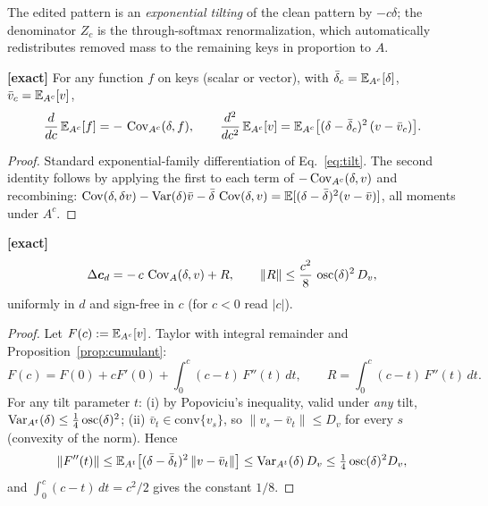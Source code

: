 \documentclass{article}
\begin{document}
The edited pattern is an \emph{exponential tilting} of the clean pattern by $-c\delta$; the denominator $Z_c$ is the through-softmax renormalization, which automatically redistributes removed mass to the remaining keys in proportion to $A$.

\begin{prop}\label{prop:cumulant}
\textbf{[exact]} For any function $f$ on keys (scalar or vector), with $\bar\delta_c = \mathbb{E}_{A^c}[\delta]$, $\bar v_c = \mathbb{E}_{A^c}[v]$,
\begin{equation}
    \frac{d}{dc}\,\mathbb{E}_{A^c}[f] = -\,\operatorname{Cov}_{A^c}(\delta, f),
    \qquad
    \frac{d^2}{dc^2}\,\mathbb{E}_{A^c}[v] = \mathbb{E}_{A^c}\big[(\delta - \bar\delta_c)^2\,(v - \bar v_c)\big].
\end{equation}
\end{prop}
\begin{proof}
Standard exponential-family differentiation of Eq.~\eqref{eq:tilt}. The second identity follows by applying the first to each term of $-\operatorname{Cov}_{A^c}(\delta, v)$ and recombining:
$\operatorname{Cov}(\delta, \delta v) - \operatorname{Var}(\delta)\bar v - \bar\delta\,\operatorname{Cov}(\delta, v) = \mathbb{E}[(\delta-\bar\delta)^2(v-\bar v)]$, all moments under $A^c$.
\end{proof}

\begin{prop}\label{prop:firstorder}
\textbf{[exact]}
\begin{equation}\label{eq:firstorder}
    \Delta\boldsymbol{c}_d = -\,c\,\operatorname{Cov}_A(\delta, v) + R,
    \qquad
    \|R\| \le \frac{c^2}{8}\,\operatorname{osc}(\delta)^2\, D_v ,
\end{equation}
uniformly in $d$ and sign-free in $c$ (for $c<0$ read $|c|$).
\end{prop}
\begin{proof}
Let $F(c) := \mathbb{E}_{A^c}[v]$. Taylor with integral remainder and Proposition~\ref{prop:cumulant}:
\begin{equation}
    F(c) = F(0) + cF'(0) + \int_0^c (c-t)\,F''(t)\,dt, \qquad R = \int_0^c (c-t)\,F''(t)\,dt .
\end{equation}
For any tilt parameter $t$: (i) by Popoviciu's inequality, valid under \emph{any} tilt, $\operatorname{Var}_{A^t}(\delta) \le \tfrac14\operatorname{osc}(\delta)^2$; (ii) $\bar v_t \in \mathrm{conv}\{v_s\}$, so $\|v_s - \bar v_t\| \le D_v$ for every $s$ (convexity of the norm). Hence
\begin{equation}
    \|F''(t)\| \le \mathbb{E}_{A^t}\big[(\delta - \bar\delta_t)^2\,\|v - \bar v_t\|\big]
    \le \operatorname{Var}_{A^t}(\delta)\, D_v \le \tfrac14\operatorname{osc}(\delta)^2 D_v ,
\end{equation}
and $\int_0^c(c-t)\,dt = c^2/2$ gives the constant $1/8$.
\end{proof}
\end{document}
